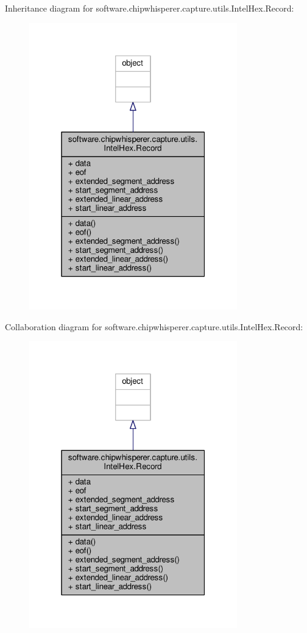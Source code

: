 Inheritance diagram for software.\+chipwhisperer.\+capture.\+utils.\+Intel\+Hex.\+Record\+:\nopagebreak
\begin{figure}[H]
\begin{center}
\leavevmode
\includegraphics[width=256pt]{d8/d0a/classsoftware_1_1chipwhisperer_1_1capture_1_1utils_1_1IntelHex_1_1Record__inherit__graph}
\end{center}
\end{figure}


Collaboration diagram for software.\+chipwhisperer.\+capture.\+utils.\+Intel\+Hex.\+Record\+:\nopagebreak
\begin{figure}[H]
\begin{center}
\leavevmode
\includegraphics[width=256pt]{d2/d55/classsoftware_1_1chipwhisperer_1_1capture_1_1utils_1_1IntelHex_1_1Record__coll__graph}
\end{center}
\end{figure}


